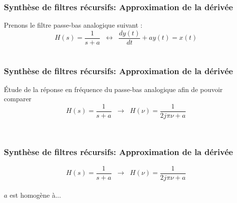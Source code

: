 \documentclass{beamer}
\begin{document}
\begin{frame}
\frametitle{Synthèse de filtres récursifs: Approximation de la dérivée}
Prenons le filtre passe-bas analogique suivant  :
\[ H(s) = \frac{1}{s+a} \; \;  \leftrightarrow \; \; \frac{dy(t)}{dt} + ay(t) = x(t) \]\\


\end{frame}

\begin{frame}
\frametitle{Synthèse de filtres récursifs: Approximation de la dérivée}

\'Etude de la réponse en fréquence du passe-bas analogique afin de pouvoir comparer\\
\vspace{0.5cm}
\[H(s) = \frac{1}{s+a} \; \;  \rightarrow \; \; H(\nu) = \frac{1}{2j\pi \nu + a}\]\\
\vspace{0.5cm}

\begin{columns}
\column{60mm}


\column{60mm}


\end{columns}
\vspace{1cm}
\end{frame}

\begin{frame}
\frametitle{Synthèse de filtres récursifs: Approximation de la dérivée}
\[H(s) = \frac{1}{s+a} \; \;  \rightarrow \; \; H(\nu) = \frac{1}{2j\pi \nu + a}\]\\
\vspace{0.5 cm}
$a$ est homogène à...  \\
\vspace{0.5 cm}

\end{frame}
\end{document}
